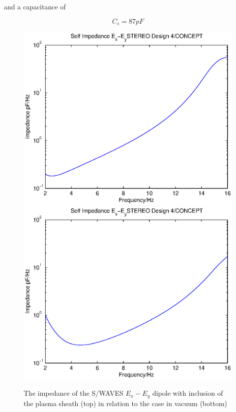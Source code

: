 \documentclass[a4paper,11pt]{thesis}
\begin{document}
and a capacitance of

\begin{equation}
    C_s=87pF
\end{equation}

\begin{figure}
\begin{center}
  \includegraphics[width=11.5cm]{DissPics/impedance_stereo_dipole_vac.eps}
\includegraphics[width=11.5cm]{DissPics/impedance_stereo_dipole_sheath.eps}
  \caption{The impedance of the S/WAVES $E_x-E_y$ dipole with inclusion of the plasma sheath (top) in relation to the case in vacuum (bottom)}\label{fig:imp_stereo_sheath_dipole}
  \end{center}
\end{figure}
\end{document}
